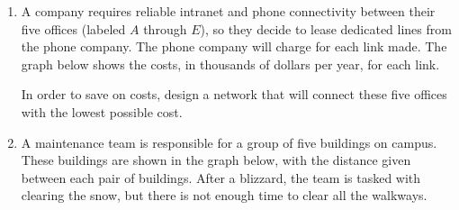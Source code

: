 \begin{enumerate}
\begin{center}
\end{center}

\item A company requires reliable intranet and phone connectivity between their five offices (labeled $A$ through $E$), so they decide to lease dedicated lines from the phone company.  The phone company will charge for each link made.  The graph below shows the costs, in thousands of dollars per year, for each link.
\begin{center}
\end{center}
In order to save on costs, design a network that will connect these five offices with the lowest possible cost.

\item A maintenance team is responsible for a group of five buildings on campus.  These buildings are shown in the graph below, with the distance given between each pair of buildings.  After a blizzard, the team is tasked with clearing the snow, but there is not enough time to clear all the walkways.
\begin{center}
\end{center}
\end{enumerate}
